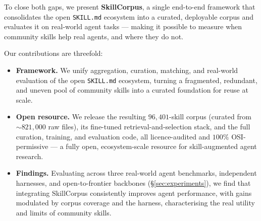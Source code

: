 To close both gaps, we present \textbf{SkillCorpus}, a single end-to-end framework that consolidates the open \texttt{SKILL.md} ecosystem into a curated, deployable corpus and evaluates it on real-world agent tasks — making it possible to measure when community skills help real agents, and where they do not.

Our contributions are threefold:
\begin{itemize}
\item \textbf{Framework.} We unify aggregation, curation, matching, and real-world evaluation of the open \texttt{SKILL.md} ecosystem, turning a fragmented, redundant, and uneven pool of community skills into a curated foundation for reuse at scale.

\item \textbf{Open resource.} We release the resulting $96{,}401$-skill corpus (curated from $\sim$$821{,}000$ raw files), its fine-tuned retrieval-and-selection stack, and the full curation, training, and evaluation code, all licence-audited and $100\%$ OSI-permissive — a fully open, ecosystem-scale resource for skill-augmented agent research.

\item \textbf{Findings.} Evaluating across three real-world agent benchmarks, independent harnesses, and open-to-frontier backbones (\S\ref{sec:experiments}), we find that integrating SkillCorpus consistently improves agent performance, with gains modulated by corpus coverage and the harness, characterising the real utility and limits of community skills.



\end{itemize}
